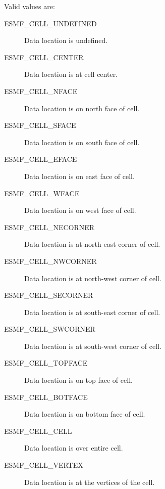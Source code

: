 Valid values are:
\begin{description}
  \item[ESMF\_CELL\_UNDEFINED]  Data location is undefined.
  \item[ESMF\_CELL\_CENTER] Data location is at cell center.
  \item[ESMF\_CELL\_NFACE] Data location is on north face of cell.
  \item[ESMF\_CELL\_SFACE] Data location is on south face of cell.
  \item[ESMF\_CELL\_EFACE] Data location is on east face of cell.
  \item[ESMF\_CELL\_WFACE] Data location is on west face of cell.
  \item[ESMF\_CELL\_NECORNER] Data location is at north-east corner of cell.
  \item[ESMF\_CELL\_NWCORNER] Data location is at north-west corner of cell.
  \item[ESMF\_CELL\_SECORNER] Data location is at south-east corner of cell.
  \item[ESMF\_CELL\_SWCORNER] Data location is at south-west corner of cell.
  \item[ESMF\_CELL\_TOPFACE] Data location is on top face of cell.
  \item[ESMF\_CELL\_BOTFACE] Data location is on bottom face of cell.
  \item[ESMF\_CELL\_CELL] Data location is over entire cell.
  \item[ESMF\_CELL\_VERTEX] Data location is at the vertices of the cell.
\end{description}

